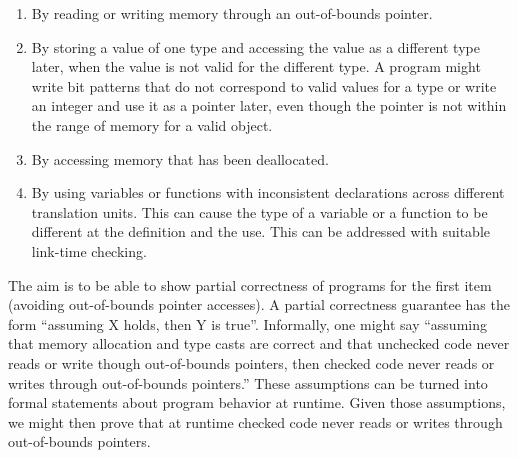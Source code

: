 \begin{enumerate}
\item
  By reading or writing memory through an out-of-bounds pointer.
\item
  By storing a value of one type and accessing the value as a different
  type later, when the value is not valid for the different type. A
  program might write bit patterns that do not correspond to valid
  values for a type or write an integer and use it as a pointer later,
  even though the pointer is not within the range of memory for a valid
  object.
\item
  By accessing memory that has been deallocated.
\item
  By using variables or functions with inconsistent declarations across
  different translation units. This can cause the type of a variable or
  a function to be different at the definition and the use. This can be
  addressed with suitable link-time checking.
\end{enumerate}

The aim is to be able to show partial correctness of programs for the
first item (avoiding out-of-bounds pointer accesses). A
partial correctness guarantee has the form ``assuming X holds, then Y is
true''. Informally, one might say ``assuming that memory allocation and
type casts are correct and that unchecked code never reads or write though
out-of-bounds pointers, then checked code never reads or writes through
out-of-bounds pointers.'' These assumptions can be turned into formal
statements about program behavior at runtime. Given those assumptions,
we might then prove that at runtime checked code never reads or writes
through out-of-bounds pointers.
